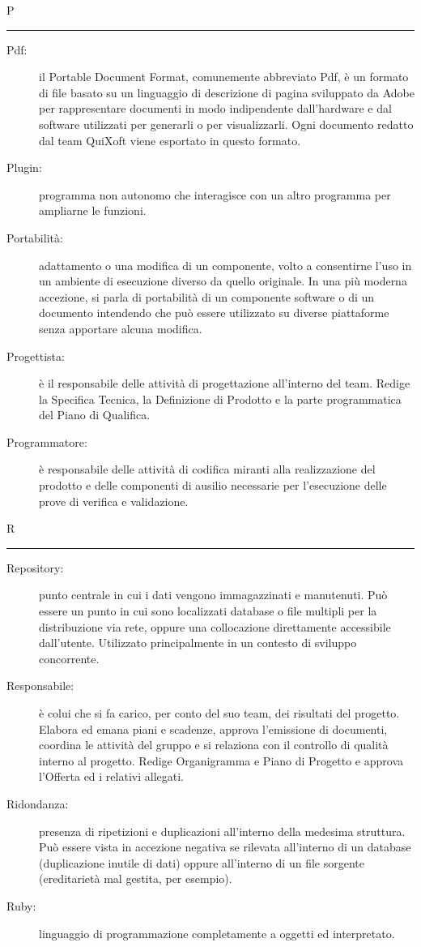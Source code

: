 \documentclass[11pt,a4paper]{article}
\begin{document}
\bigskip
\Huge P \bigskip
\hrule
\smallskip
\normalsize
\begin{description}
	\item[Pdf:] il Portable Document Format, comunemente abbreviato Pdf, è un formato di file basato su un linguaggio di descrizione di pagina sviluppato da Adobe per rappresentare documenti in modo indipendente dall'hardware e dal software utilizzati per generarli o per visualizzarli. Ogni documento redatto dal team QuiXoft viene esportato in questo formato.
	\item[Plugin:] programma non autonomo che interagisce con un altro programma per ampliarne le funzioni.
	\item[Portabilità:] adattamento o una modifica di un componente, volto a consentirne l'uso in un ambiente di esecuzione diverso da quello originale. In una più moderna accezione, si parla di portabilità di un componente software o di un documento intendendo che può essere utilizzato su diverse piattaforme senza apportare alcuna modifica.
	\item[Progettista:] è il responsabile delle attività di progettazione all'interno del team. Redige la Specifica Tecnica, la Definizione di Prodotto e la parte programmatica del Piano di Qualifica.
	\item[Programmatore:] è responsabile delle attività di codifica miranti alla realizzazione del prodotto e delle componenti di ausilio necessarie per l'esecuzione delle prove di verifica e validazione.
\end{description}
\bigskip
\Huge R \bigskip
\hrule
\smallskip
\normalsize
\begin{description}
	\item[Repository:] punto centrale in cui i dati vengono immagazzinati e manutenuti. Può essere un punto in cui sono localizzati database o file multipli per la distribuzione via rete, oppure una collocazione direttamente accessibile dall'utente. Utilizzato principalmente in un contesto di sviluppo concorrente.
	\item[Responsabile:] è colui che si fa carico, per conto del suo team, dei risultati del progetto. Elabora ed emana piani e scadenze, approva l'emissione di documenti, coordina le attività del gruppo e si relaziona con il controllo di qualità interno al progetto. Redige Organigramma e Piano di Progetto e approva l'Offerta ed i relativi allegati.
	\item[Ridondanza:] presenza di ripetizioni e duplicazioni all'interno della medesima struttura. Può essere vista in accezione negativa se rilevata all'interno di un database (duplicazione inutile di dati) oppure all'interno di un file sorgente (ereditarietà mal gestita, per esempio).
	\item[Ruby:] linguaggio di programmazione completamente a oggetti ed interpretato.
\end{description}
\end{document}
